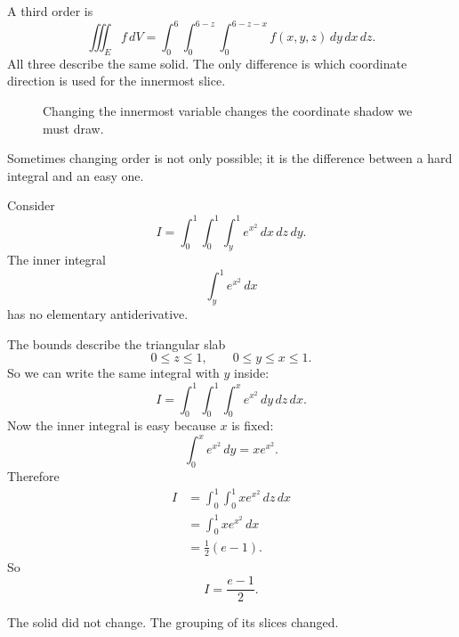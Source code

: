 A third order is
\[
\boxed{
\iiint_E f\,dV
=
\int_0^6\int_0^{6-z}\int_0^{6-z-x}
f(x,y,z)\,dy\,dx\,dz.
}
\]
All three describe the same solid.  The only difference is which coordinate direction is
used for the innermost slice.

\begin{figure}[h]
\centering
{}
\caption{Changing the innermost variable changes the coordinate shadow we must draw.}
\end{figure}

Sometimes changing order is not only possible; it is the difference between a hard
integral and an easy one.

\begin{example}
Consider
\[
    I=
    \int_0^1\int_0^1\int_y^1 e^{x^2}\,dx\,dz\,dy.
\]
The inner integral
\[
    \int_y^1 e^{x^2}\,dx
\]
has no elementary antiderivative.

The bounds describe the triangular slab
\[
    0\le z\le1,
    \qquad
    0\le y\le x\le1.
\]
So we can write the same integral with \(y\) inside:
\[
    I=
    \int_0^1\int_0^1\int_0^x e^{x^2}\,dy\,dz\,dx.
\]
Now the inner integral is easy because \(x\) is fixed:
\[
    \int_0^x e^{x^2}\,dy=xe^{x^2}.
\]
Therefore
\[
\begin{aligned}
I
&=
\int_0^1\int_0^1 xe^{x^2}\,dz\,dx\\
&=
\int_0^1 xe^{x^2}\,dx\\
&=
\frac12(e-1).
\end{aligned}
\]
So
\[
\boxed{
    I=\frac{e-1}{2}.
}
\]

The solid did not change.  The grouping of its slices changed.
\end{example}

